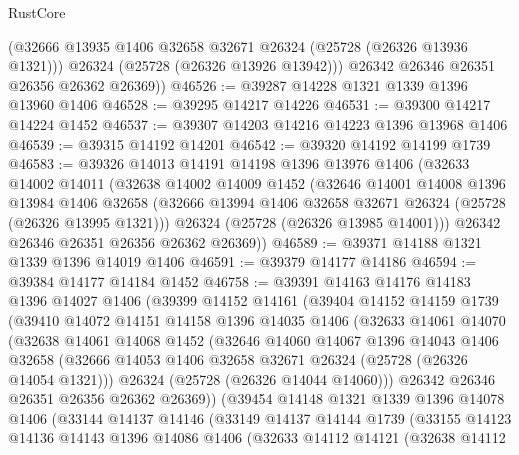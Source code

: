 \begin{lexlean}{RustCore}
\begin{coremodule}
          (@32666 @13935 @1406 @32658 @32671 @26324 (@25728 (@26326 @13936 @1321)))
          @26324
          (@25728 (@26326 @13926 @13942)))
        @26342
        @26346
        @26351
        @26356
        @26362
        @26369))
@46526 := @39287 @14228 @1321 @1339 @1396 @13960 @1406
@46528 := @39295 @14217 @14226
@46531 := @39300 @14217 @14224 @1452
@46537 := @39307 @14203 @14216 @14223 @1396 @13968 @1406
@46539 := @39315 @14192 @14201
@46542 := @39320 @14192 @14199 @1739
@46583 := @39326
    @14013
    @14191
    @14198
    @1396
    @13976
    @1406
    (@32633
      @14002
      @14011
      (@32638
        @14002
        @14009
        @1452
        (@32646
          @14001
          @14008
          @1396
          @13984
          @1406
          @32658
          (@32666 @13994 @1406 @32658 @32671 @26324 (@25728 (@26326 @13995 @1321)))
          @26324
          (@25728 (@26326 @13985 @14001)))
        @26342
        @26346
        @26351
        @26356
        @26362
        @26369))
@46589 := @39371 @14188 @1321 @1339 @1396 @14019 @1406
@46591 := @39379 @14177 @14186
@46594 := @39384 @14177 @14184 @1452
@46758 := @39391
    @14163
    @14176
    @14183
    @1396
    @14027
    @1406
    (@39399
      @14152
      @14161
      (@39404
        @14152
        @14159
        @1739
        (@39410
          @14072
          @14151
          @14158
          @1396
          @14035
          @1406
          (@32633
            @14061
            @14070
            (@32638
              @14061
              @14068
              @1452
              (@32646
                @14060
                @14067
                @1396
                @14043
                @1406
                @32658
                (@32666 @14053 @1406 @32658 @32671 @26324 (@25728 (@26326 @14054 @1321)))
                @26324
                (@25728 (@26326 @14044 @14060)))
              @26342
              @26346
              @26351
              @26356
              @26362
              @26369))
          (@39454
            @14148
            @1321
            @1339
            @1396
            @14078
            @1406
            (@33144
              @14137
              @14146
              (@33149
                @14137
                @14144
                @1739
                (@33155
                  @14123
                  @14136
                  @14143
                  @1396
                  @14086
                  @1406
                  (@32633
                    @14112
                    @14121
                    (@32638
                      @14112

\end{coremodule}
\end{lexlean}
